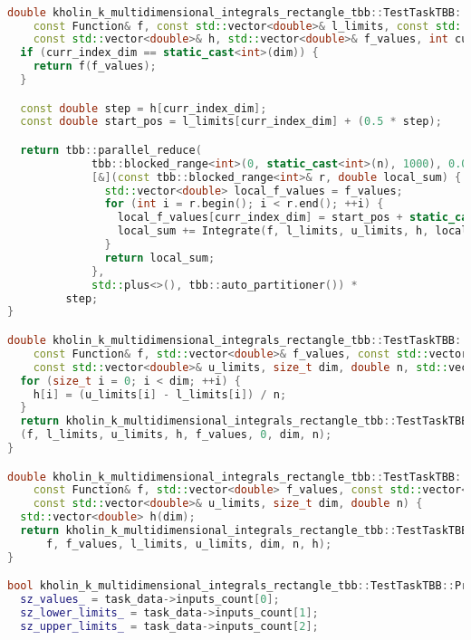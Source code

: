\documentclass[14pt,a4paper]{article}
\begin{document}
\begin{framed}
\begin{lstlisting}[language=C++]

double kholin_k_multidimensional_integrals_rectangle_tbb::TestTaskTBB::Integrate(
    const Function& f, const std::vector<double>& l_limits, const std::vector<double>& u_limits,
    const std::vector<double>& h, std::vector<double>& f_values, int curr_index_dim, size_t dim, double n) {
  if (curr_index_dim == static_cast<int>(dim)) {
    return f(f_values);
  }

  const double step = h[curr_index_dim];
  const double start_pos = l_limits[curr_index_dim] + (0.5 * step);

  return tbb::parallel_reduce(
             tbb::blocked_range<int>(0, static_cast<int>(n), 1000), 0.0,
             [&](const tbb::blocked_range<int>& r, double local_sum) {
               std::vector<double> local_f_values = f_values;
               for (int i = r.begin(); i < r.end(); ++i) {
                 local_f_values[curr_index_dim] = start_pos + static_cast<double>(i) * step;
                 local_sum += Integrate(f, l_limits, u_limits, h, local_f_values, curr_index_dim + 1, dim, n);
               }
               return local_sum;
             },
             std::plus<>(), tbb::auto_partitioner()) *
         step;
}

double kholin_k_multidimensional_integrals_rectangle_tbb::TestTaskTBB::IntegrateWithRectangleMethod(
    const Function& f, std::vector<double>& f_values, const std::vector<double>& l_limits,
    const std::vector<double>& u_limits, size_t dim, double n, std::vector<double>& h) {
  for (size_t i = 0; i < dim; ++i) {
    h[i] = (u_limits[i] - l_limits[i]) / n;
  }
  return kholin_k_multidimensional_integrals_rectangle_tbb::TestTaskTBB::Integrate
  (f, l_limits, u_limits, h, f_values, 0, dim, n);
}

double kholin_k_multidimensional_integrals_rectangle_tbb::TestTaskTBB::RunMultistepSchemeMethodRectangle(
    const Function& f, std::vector<double> f_values, const std::vector<double>& l_limits,
    const std::vector<double>& u_limits, size_t dim, double n) {
  std::vector<double> h(dim);
  return kholin_k_multidimensional_integrals_rectangle_tbb::TestTaskTBB::IntegrateWithRectangleMethod(
      f, f_values, l_limits, u_limits, dim, n, h);
}

bool kholin_k_multidimensional_integrals_rectangle_tbb::TestTaskTBB::PreProcessingImpl() {
  sz_values_ = task_data->inputs_count[0];
  sz_lower_limits_ = task_data->inputs_count[1];
  sz_upper_limits_ = task_data->inputs_count[2];


\end{lstlisting}
\end{framed}
\end{document}
